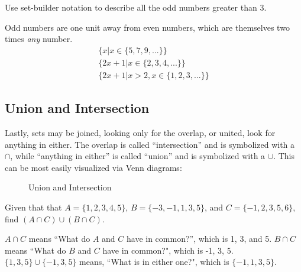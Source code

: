 \begin{example}
\exProblem
Use set-builder notation to describe all the odd numbers greater than 3.

\exSolution
Odd numbers are one unit away from even numbers, which are themselves two times \textit{any} number.
\begin{align*}
\{ x | x \in \{5, 7, 9, ...\} \} \\
\{ 2x + 1 | x \in \{2, 3, 4, ...\} \} \\
\{ 2x + 1 | x>2, x \in \{1, 2, 3, ...\} \} 
\end{align*}
\end{example}

\subsection{Union and Intersection}
Lastly, sets may be joined, looking only for the overlap, or united, look for anything in either.  
The overlap is called ``intersection'' and is symbolized with a $\cap$, while 
``anything in either'' is called ``union'' and
is symbolized with a $\cup$.  This can be most easily visualized via Venn diagrams:




\begin{figure}[h]
\centering

\caption[Union]{Union and Intersection}
\end{figure}

\begin{example}
\exProblem
Given that that $A = \{1, 2, 3, 4, 5\}$, $B = \{-3, -1, 1, 3, 5\}$, and
$C = \{-1, 2, 3, 5, 6\}$, find $(A \cap C) \cup (B \cap C)$.

\exSolution
$A \cap C$ means ``What do $A$ and $C$ have in common?'', which is 1, 3, and 5.
$B \cap C$ means ``What do $B$ and $C$ have in common?", which is -1, 3, 5.
$\{1, 3, 5\} \cup \{-1, 3, 5\}$ means, ``What is in either one?", which is $\{-1, 1, 3, 5\}$.
\end{example}

